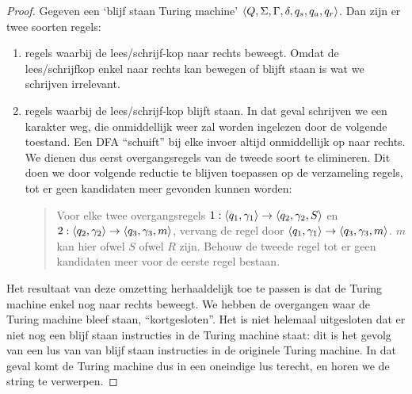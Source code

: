 \documentclass[a4paper]{article}
\begin{document}
\begin{question}
\begin{answer}
\begin{enumerate}
\begin{proof}
Gegeven een `blijf staan Turing machine' $\left\langle Q,\Sigma,\Gamma,\delta,q_s,q_a,q_r \right\rangle$. Dan zijn er twee soorten regels:
\begin{enumerate}
 \item regels waarbij de lees/schrijf-kop naar rechts beweegt. Omdat de lees/schrijfkop enkel naar rechts kan bewegen of blijft staan is wat we schrijven irrelevant.
 \item regels waarbij de lees/schrijf-kop blijft staan. In dat geval schrijven we een karakter weg, die onmiddellijk weer zal worden ingelezen door de volgende toestand.
Een DFA ``schuift'' bij elke invoer altijd onmiddellijk op naar rechts. We dienen dus eerst overgangsregels van de tweede soort te elimineren. Dit doen we door volgende reductie te blijven toepassen op de verzameling regels, tot er geen kandidaten meer gevonden kunnen worden:
\begin{quote}
Voor elke twee overgangsregels $1:\left\langle q_1,\gamma_1 \right\rangle\rightarrow\left\langle q_2,\gamma_2,S \right\rangle$ en $2:\left\langle q_2,\gamma_2 \right\rangle\rightarrow\left\langle q_3,\gamma_3,m \right\rangle$, vervang de regel door $\left\langle q_1,\gamma_1 \right\rangle\rightarrow\left\langle q_3,\gamma_3,m \right\rangle$. $m$ kan hier ofwel $S$ ofwel $R$ zijn. Behouw de tweede regel tot er geen kandidaten meer voor de eerste regel bestaan.
\end{quote}
\end{enumerate}
Het resultaat van deze omzetting herhaaldelijk toe te passen is dat de Turing machine enkel nog naar rechts beweegt. We hebben de overgangen waar de Turing machine bleef staan, ``kortgesloten''. Het is niet helemaal uitgesloten dat er niet nog een blijf staan instructies in de Turing machine staat: dit is het gevolg van een lus van van blijf staan instructies in de originele Turing machine. In dat geval komt de Turing machine dus in een oneindige lus terecht, en horen we de string te verwerpen.

\end{proof}
\end{enumerate}
\end{answer}
\end{question}
\end{document}
